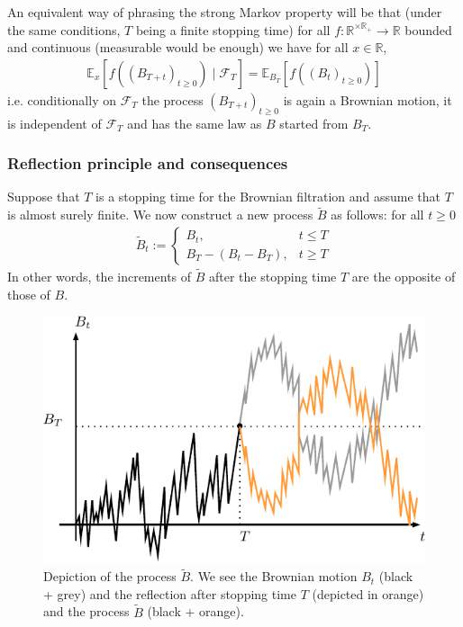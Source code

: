 \documentclass[../mainfile.tex]{subfiles}
\begin{document}
\begin{rem} An equivalent way of phrasing the strong Markov property will be that (under the same conditions, $T$ being a finite stopping time) for all $f: \mathbb{R}^{\times \mathbb{R}_+} \to \mathbb{R}$ bounded and continuous (measurable would be enough) we have for all $x \in \mathbb{R}$, 
\begin{align*}
\mathbb{E}_x[f((B_{T+t})_{t \geq 0}) \mid \mathcal{F}_T] = \mathbb{E}_{B_T} [f((B_t)_{t \geq 0})]
\end{align*}
i.e. conditionally on $\mathcal{F}_T$ the process $(B_{T+t})_{t \geq 0}$ is again a Brownian motion, it is independent of $\mathcal{F}_T$ and has the same law as $B$ started from $B_T$.
\end{rem}

\newpage
\subsubsection{Reflection principle and consequences}
Suppose that $T$ is a stopping time for the Brownian filtration and assume that $T$ is almost surely finite. We now construct a new process $\tilde{B}$ as follows: for all $t \geq 0 $
\begin{align*}
\tilde{B}_t := \begin{cases} B_t, & t \leq T \\ 
B_T -(B_t-B_T), & t \geq T \end{cases}
\end{align*}
In other words, the increments of $\tilde{B}$ after the stopping time $T$ are the opposite of those of $B$.
\begin{figure}[hbtp]
\centering
\includegraphics[scale=1]{reflectionprinc.pdf}
\caption{Depiction of the process $\tilde{B}$. We see the Brownian motion $B_t$ (black + grey) and the reflection after stopping time $T$ (depicted in orange) and the process $\tilde{B}$ (black + orange). }
\end{figure}
\end{document}
